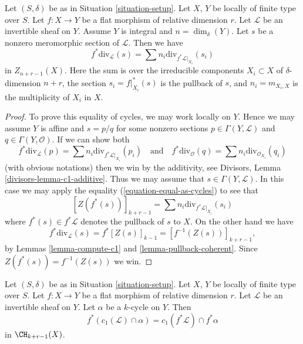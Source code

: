 \begin{lemma}
\label{lemma-prepare-flat-pullback-cap-c1}
Let $(S, \delta)$ be as in Situation \ref{situation-setup}.
Let $X$, $Y$ be locally of finite type over $S$.
Let $f : X \to Y$ be a flat morphism of relative dimension $r$.
Let $\mathcal{L}$ be an invertible sheaf on $Y$.
Assume $Y$ is integral and $n = \dim_\delta(Y)$.
Let $s$ be a nonzero meromorphic section of $\mathcal{L}$.
Then we have
$$
f^*\text{div}_\mathcal{L}(s) = \sum n_i\text{div}_{f^*\mathcal{L}|_{X_i}}(s_i)
$$
in $Z_{n + r - 1}(X)$. Here the sum is over the irreducible
components $X_i \subset X$ of $\delta$-dimension $n + r$,
the section $s_i = f|_{X_i}^*(s)$ is the pullback of $s$, and
$n_i = m_{X_i, X}$ is the multiplicity of $X_i$ in $X$.
\end{lemma}

\begin{proof}
To prove this equality of cycles, we may work locally on $Y$.
Hence we may assume $Y$ is affine and $s = p/q$ for some nonzero
sections $p \in \Gamma(Y, \mathcal{L})$ and $q \in \Gamma(Y, \mathcal{O})$.
If we can show both
$$
f^*\text{div}_\mathcal{L}(p) =
\sum n_i\text{div}_{f^*\mathcal{L}|_{X_i}}(p_i)
\quad\text{and}\quad
f^*\text{div}_\mathcal{O}(q) =
\sum n_i\text{div}_{\mathcal{O}_{X_i}}(q_i)
$$
(with obvious notations) then we win by the
additivity, see Divisors, Lemma \ref{divisors-lemma-c1-additive}.
Thus we may assume that $s \in \Gamma(Y, \mathcal{L})$.
In this case we may apply the equality
(\ref{equation-equal-as-cycles}) to see that
$$
[Z(f^*(s))]_{k + r - 1} =
\sum n_i\text{div}_{f^*\mathcal{L}|_{X_i}}(s_i)
$$
where $f^*(s) \in f^*\mathcal{L}$ denotes the pullback of $s$ to $X$.
On the other hand we have
$$
f^*\text{div}_\mathcal{L}(s) = f^*[Z(s)]_{k - 1}
= [f^{-1}(Z(s))]_{k + r - 1},
$$
by Lemmas \ref{lemma-compute-c1} and \ref{lemma-pullback-coherent}.
Since $Z(f^*(s)) = f^{-1}(Z(s))$ we win.
\end{proof}

\begin{lemma}
\label{lemma-flat-pullback-cap-c1}
Let $(S, \delta)$ be as in Situation \ref{situation-setup}.
Let $X$, $Y$ be locally of finite type over $S$.
Let $f : X \to Y$ be a flat morphism of relative dimension $r$.
Let $\mathcal{L}$ be an invertible sheaf on $Y$.
Let $\alpha$ be a $k$-cycle on $Y$.
Then
$$
f^*(c_1(\mathcal{L}) \cap \alpha) = c_1(f^*\mathcal{L}) \cap f^*\alpha
$$
in $\CH_{k + r - 1}(X)$.
\end{lemma}


